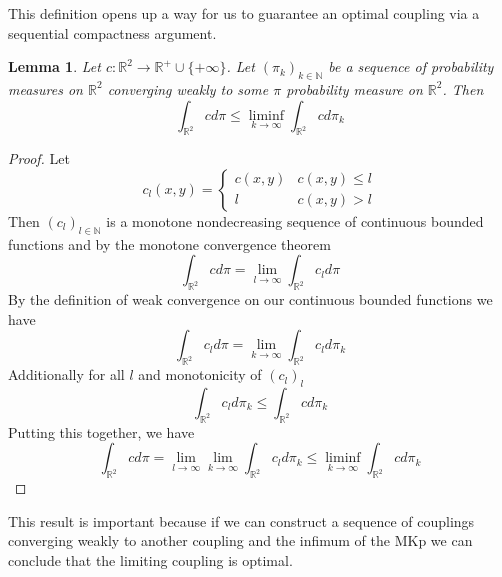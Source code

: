 \documentclass[11pt]{amsart}
\newtheorem{lemma}[theorem]{Lemma}         %
\theoremstyle{definition}                  %
\theoremstyle{remark}                      %
\begin{document}
This definition opens up a way for us to guarantee an optimal coupling via a sequential compactness argument.

\begin{lemma}\label{lemma:lemma_1}
    Let $c: \mathbb{R}^2 \rightarrow \mathbb{R}^{+} \cup \{+\infty\}$. Let $(\pi_k)_{k \in \mathbb{N}}$ be 
    a sequence of probability measures on $ \mathbb{R}^2$ converging weakly
    to some $ \pi$ probability measure on $ \mathbb{R}^2$. Then
    \[
    \int_{ \mathbb{R}^2}^{}c d\pi \le \liminf_{k\to \infty} \int_{ \mathbb{R}^2}^{} c d\pi_k
    \] 
\end{lemma}
\begin{proof}
    Let
    \[
    c_l(x,y) = 
    \begin{cases}
        c(x,y) & c(x,y) \le l\\
        l & c(x,y) > l
    \end{cases}
    \] 
    Then $(c_l)_{l \in \mathbb{N}}$ is a monotone nondecreasing sequence of continuous bounded functions
    and by the monotone convergence theorem
    \[
    \int_{ \mathbb{R}^2}^{}c d\pi = \lim_{l\to \infty} \int_{ \mathbb{R}^2}^{}c_l d\pi
    \] 
    By the definition of weak convergence on our continuous bounded functions we have
    \[
    \int_{ \mathbb{R}^2}^{}c_l d\pi = \lim_{k\to \infty} \int_{ \mathbb{R}^2}^{}c_l d\pi_k
    \] 
    Additionally for all $l$ and monotonicity of $(c_l)_l$
     \[
    \int_{ \mathbb{R}^2}^{}c_l d\pi_k \le \int_{ \mathbb{R}^2}^{}c d\pi_k
    \] 
    Putting this together, we have
    \[
    \int_{ \mathbb{R}^2}^{}c d\pi = \lim_{l\to \infty} \lim_{k\to \infty}\int_{ \mathbb{R}^2}^{}c_l d\pi_k \le \liminf_{k\to \infty}\int_{ \mathbb{R}^2}^{} c d\pi_k
    \] 
\end{proof}

This result is important because if we can construct a sequence of couplings converging weakly to 
another coupling and the infimum of the MKp we can conclude that the limiting coupling is optimal.
\end{document}
